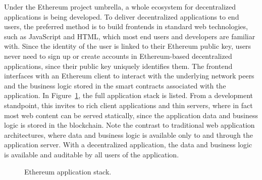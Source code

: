 Under the Ethereum project umbrella, a whole ecosystem for decentralized applications is being developed. To deliver decentralized applications to end users, the preferred method is to build frontends in standard web technologies, such as JavaScript and HTML, which most end users and developers are familiar with. Since the identity of the user is linked to their Ethereum public key, users never need to sign up or create accounts in Ethereum-based decentralized applications, since their public key uniquely identifies them. The frontend interfaces with an Ethereum client to interact with the underlying network peers and the business logic stored in the smart contracts associated with the application. In Figure~\ref{fig:tech:stack}, the full application stack is listed.
From a development standpoint, this invites to rich client applications and thin servers, where in fact most web content can be served statically, since the application data and business logic is stored in the blockchain. Note the contrast to traditional web application architectures, where data and business logic is available only to and through the application server. With a decentralized application, the data and business logic is available and auditable by all users of the application.


\begin{figure}[ht]
\centering
{}
\caption{Ethereum application stack.}
\label{fig:tech:stack}
\end{figure}

